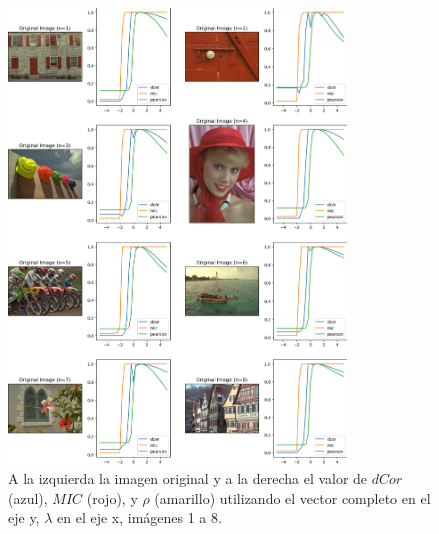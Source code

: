 \begin{figure}
    \centering
    \includegraphics[width=0.8\textwidth]{figuras/full_comp_1.png}
    \caption{A la izquierda la imagen original y a la derecha el valor de $dCor$ (azul), $MIC$ (rojo), y $\rho$ (amarillo) utilizando el vector completo en el eje y, $\lambda$ en el eje x, im\'agenes 1 a 8.}
\end{figure}

